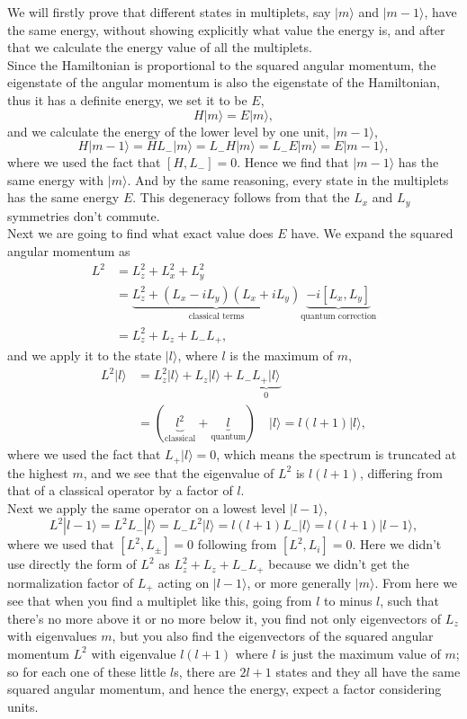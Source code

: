 \documentclass{article}
\newcommand{\be}{\begin{equation}}
\newcommand{\ee}{\end{equation}}
\renewcommand{\1}{\left}
\renewcommand{\2}{\right}
\newcommand{\ra}{\rangle}
\begin{document}
We will firstly prove that different states in multiplets, say $|m\ra$ and $|m-1\ra$, have the same energy, without showing explicitly what value the energy is, and after that we calculate the energy value of all the multiplets.\\
Since the Hamiltonian is proportional to the squared angular momentum, the eigenstate of the angular momentum is also the eigenstate of the Hamiltonian, thus it has a definite energy, we set it to be $E$,
\be
H|m\ra=E|m\ra,
\ee
and we calculate the energy of the lower level by one unit, $|m-1\ra$,
\be
H|m-1\ra=HL_-|m\ra=L_-H|m\ra=L_-E|m\ra=E|m-1\ra,
\ee
where we used the fact that $[H,L_-]=0$. Hence we find that $|m-1\ra$ has the same energy with $|m\ra$. And by the same reasoning, every state in the multiplets has the same energy $E$. This degeneracy follows from that the $L_x$ and $L_y$ symmetries don't commute.\\
Next we are going to find what exact value does $E$ have. We expand the squared angular momentum as
\be\begin{split}
L^2&= L_z^2+L_x^2+L_y^2\\
&=\underbrace{L_z^2+(L_x-iL_y)(L_x+iL_y)}_{\text{classical terms}}\underbrace{-i[L_x,L_y]}_{\text{quantum correction}}\\
&=L_z^2+L_z+L_-L_+,
\end{split}\ee
and we apply it to the state $|l\ra$, where $l$ is the maximum of $m$,
\be\begin{split}
L^2|l\ra&=L_z^2|l\ra+L_z|l\ra+L_-\underbrace{L_+|l\ra}_0\\
&=(\underbrace{l^2}_{\text{classical}}+\underbrace{l}_{\text{quantum}})\quad |l\ra=l(l+1)|l\ra,
\end{split}\ee
where we used the fact that $L_+|l\ra=0$, which means the spectrum is truncated at the highest $m$, and we see that the eigenvalue of $L^2$ is $l(l+1)$, differing from that of a classical operator by a factor of $l$.\\
Next we apply the same operator on a lowest level $|l-1\ra$,
\be
L^2|l-1\ra=L^2L_-|l\ra=L_-L^2|l\ra=l(l+1)L_-|l\ra=l(l+1)|l-1\ra,
\ee
where we used that $[L^2, L_\pm]=0$ following from $[L^2,L_i]=0$. Here we didn't use directly the form of $L^2$ as $L_z^2+L_z+L_-L_+$ because we didn't get the normalization factor of $L_+$ acting on $|l-1\ra$, or more generally $|m\ra$. From here we see that when you find a multiplet like this, going from $l$ to minus $l$, such that there's no more above it or no more below it, you find not only eigenvectors of $L_z$ with eigenvalues $m$, but you also find the eigenvectors of the squared angular momentum $L^2$ with eigenvalue $l(l+1)$ where $l$ is just the maximum value of $m$; so for each one of these little $l$s, there are $2l+1$ states and they all have the same squared angular momentum, and hence the energy, expect a factor considering units.
\end{document}

